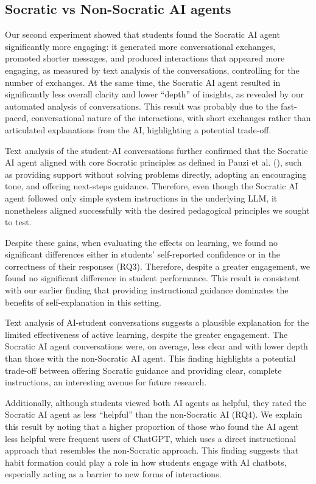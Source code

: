 \documentclass[
  11pt,
]{article}
\begin{document}
\subsection{Socratic vs Non-Socratic AI agents}\label{socratic-vs-non-socratic-ai-agents}

Our second experiment showed that students found the Socratic AI agent significantly more engaging: it generated more conversational exchanges, promoted shorter messages, and produced interactions that appeared more engaging, as measured by text analysis of the conversations, controlling for the number of exchanges. At the same time, the Socratic AI agent resulted in significantly less overall clarity and lower ``depth'' of insights, as revealed by our automated analysis of conversations. This result was probably due to the fast-paced, conversational nature of the interactions, with short exchanges rather than articulated explanations from the AI, highlighting a potential trade-off.

Text analysis of the student-AI conversations further confirmed that the Socratic AI agent aligned with core Socratic principles as defined in Pauzi et al. (), such as providing support without solving problems directly, adopting an encouraging tone, and offering next-steps guidance. Therefore, even though the Socratic AI agent followed only simple system instructions in the underlying LLM, it nonetheless aligned successfully with the desired pedagogical principles we sought to test.

Despite these gains, when evaluating the effects on learning, we found no significant differences either in students' self-reported confidence or in the correctness of their responses (RQ3). Therefore, despite a greater engagement, we found no significant difference in student performance. This result is consistent with our earlier finding that providing instructional guidance dominates the benefits of self-explanation in this setting.

Text analysis of AI-student conversations suggests a plausible explanation for the limited effectiveness of active learning, despite the greater engagement. The Socratic AI agent conversations were, on average, less clear and with lower depth than those with the non-Socratic AI agent. This finding highlights a potential trade-off between offering Socratic guidance and providing clear, complete instructions, an interesting avenue for future research.

Additionally, although students viewed both AI agents as helpful, they rated the Socratic AI agent as less ``helpful'' than the non-Socratic AI (RQ4). We explain this result by noting that a higher proportion of those who found the AI agent less helpful were frequent users of ChatGPT, which uses a direct instructional approach that resembles the non-Socratic approach. This finding suggests that habit formation could play a role in how students engage with AI chatbots, especially acting as a barrier to new forms of interactions.
\end{document}
